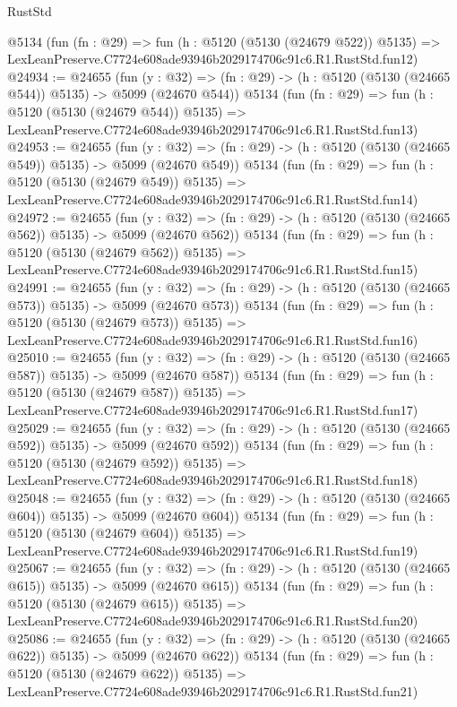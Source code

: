 \begin{lexlean}{RustStd}
\begin{coremodule}
    @5134
    (fun (fn : @29) =>
    fun (h : @5120 (@5130 (@24679 @522)) @5135) =>
    LexLeanPreserve.C7724e608ade93946b2029174706c91c6.R1.RustStd.fun12)
@24934 := @24655
    (fun (y : @32) => (fn : @29) -> (h : @5120 (@5130 (@24665 @544)) @5135) -> @5099 (@24670 @544))
    @5134
    (fun (fn : @29) =>
    fun (h : @5120 (@5130 (@24679 @544)) @5135) =>
    LexLeanPreserve.C7724e608ade93946b2029174706c91c6.R1.RustStd.fun13)
@24953 := @24655
    (fun (y : @32) => (fn : @29) -> (h : @5120 (@5130 (@24665 @549)) @5135) -> @5099 (@24670 @549))
    @5134
    (fun (fn : @29) =>
    fun (h : @5120 (@5130 (@24679 @549)) @5135) =>
    LexLeanPreserve.C7724e608ade93946b2029174706c91c6.R1.RustStd.fun14)
@24972 := @24655
    (fun (y : @32) => (fn : @29) -> (h : @5120 (@5130 (@24665 @562)) @5135) -> @5099 (@24670 @562))
    @5134
    (fun (fn : @29) =>
    fun (h : @5120 (@5130 (@24679 @562)) @5135) =>
    LexLeanPreserve.C7724e608ade93946b2029174706c91c6.R1.RustStd.fun15)
@24991 := @24655
    (fun (y : @32) => (fn : @29) -> (h : @5120 (@5130 (@24665 @573)) @5135) -> @5099 (@24670 @573))
    @5134
    (fun (fn : @29) =>
    fun (h : @5120 (@5130 (@24679 @573)) @5135) =>
    LexLeanPreserve.C7724e608ade93946b2029174706c91c6.R1.RustStd.fun16)
@25010 := @24655
    (fun (y : @32) => (fn : @29) -> (h : @5120 (@5130 (@24665 @587)) @5135) -> @5099 (@24670 @587))
    @5134
    (fun (fn : @29) =>
    fun (h : @5120 (@5130 (@24679 @587)) @5135) =>
    LexLeanPreserve.C7724e608ade93946b2029174706c91c6.R1.RustStd.fun17)
@25029 := @24655
    (fun (y : @32) => (fn : @29) -> (h : @5120 (@5130 (@24665 @592)) @5135) -> @5099 (@24670 @592))
    @5134
    (fun (fn : @29) =>
    fun (h : @5120 (@5130 (@24679 @592)) @5135) =>
    LexLeanPreserve.C7724e608ade93946b2029174706c91c6.R1.RustStd.fun18)
@25048 := @24655
    (fun (y : @32) => (fn : @29) -> (h : @5120 (@5130 (@24665 @604)) @5135) -> @5099 (@24670 @604))
    @5134
    (fun (fn : @29) =>
    fun (h : @5120 (@5130 (@24679 @604)) @5135) =>
    LexLeanPreserve.C7724e608ade93946b2029174706c91c6.R1.RustStd.fun19)
@25067 := @24655
    (fun (y : @32) => (fn : @29) -> (h : @5120 (@5130 (@24665 @615)) @5135) -> @5099 (@24670 @615))
    @5134
    (fun (fn : @29) =>
    fun (h : @5120 (@5130 (@24679 @615)) @5135) =>
    LexLeanPreserve.C7724e608ade93946b2029174706c91c6.R1.RustStd.fun20)
@25086 := @24655
    (fun (y : @32) => (fn : @29) -> (h : @5120 (@5130 (@24665 @622)) @5135) -> @5099 (@24670 @622))
    @5134
    (fun (fn : @29) =>
    fun (h : @5120 (@5130 (@24679 @622)) @5135) =>
    LexLeanPreserve.C7724e608ade93946b2029174706c91c6.R1.RustStd.fun21)

\end{coremodule}
\end{lexlean}
